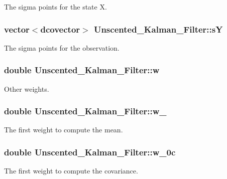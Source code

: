 The sigma points for the state X. 

\hypertarget{class_unscented___kalman___filter_4e7f5cd7580c525eb27c489dd5785453}{
\subsubsection[{sY}]{\setlength{\rightskip}{0pt plus 5cm}vector$<$dcovector$>$ {\bf Unscented\_\-Kalman\_\-Filter::sY}}}
\label{class_unscented___kalman___filter_4e7f5cd7580c525eb27c489dd5785453}


The sigma points for the observation. 

\hypertarget{class_unscented___kalman___filter_1869e471af5a12af031e9ff436756b95}{
\subsubsection[{w}]{\setlength{\rightskip}{0pt plus 5cm}double {\bf Unscented\_\-Kalman\_\-Filter::w}}}
\label{class_unscented___kalman___filter_1869e471af5a12af031e9ff436756b95}


Other weights. 

\hypertarget{class_unscented___kalman___filter_59707b0a7653a0610266e553eb5786f6}{
\subsubsection[{w\_\-0}]{\setlength{\rightskip}{0pt plus 5cm}double {\bf Unscented\_\-Kalman\_\-Filter::w\_}}}
\label{class_unscented___kalman___filter_59707b0a7653a0610266e553eb5786f6}


The first weight to compute the mean. 

\hypertarget{class_unscented___kalman___filter_d04e96c03af71db29723963be6999be6}{
\subsubsection[{w\_\-0c}]{\setlength{\rightskip}{0pt plus 5cm}double {\bf Unscented\_\-Kalman\_\-Filter::w\_\-0c}}}
\label{class_unscented___kalman___filter_d04e96c03af71db29723963be6999be6}


The first weight to compute the covariance. 

